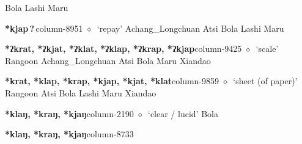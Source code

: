          Bola 
\hspace{1ex}
         Lashi 
\hspace{1ex}
         Maru 
  \item {\footnotesize \textbf{*kjap\,?\,}}{\tiny column-8951}
         $\diamond$~`repay'
         Achang\_Longchuan 
\hspace{1ex}
         Atsi 
\hspace{1ex}
         Bola 
\hspace{1ex}
         Lashi 
\hspace{1ex}
         Maru 
  \item {\footnotesize \textbf{*ʔkrat, *ʔkjat, *ʔklat, *ʔklap, *ʔkrap, *ʔkjap}}{\tiny column-9425}
         $\diamond$~`scale'
         Rangoon 
\hspace{1ex}
         Achang\_Longchuan 
\hspace{1ex}
         Atsi 
\hspace{1ex}
         Bola 
\hspace{1ex}
         Maru 
\hspace{1ex}
         Xiandao 
  \item {\footnotesize \textbf{*krat, *klap, *krap, *kjap, *kjat, *klat}}{\tiny column-9859}
         $\diamond$~`sheet (of paper)'
         Rangoon 
\hspace{1ex}
         Atsi 
\hspace{1ex}
         Bola 
\hspace{1ex}
         Lashi 
\hspace{1ex}
         Maru 
\hspace{1ex}
         Xiandao 
  \item {\footnotesize \textbf{*klaŋ, *kraŋ, *kjaŋ}}{\tiny column-2190}
         $\diamond$~`clear / lucid'
         Bola 
  \item {\footnotesize \textbf{*klaŋ, *kraŋ, *kjaŋ}}{\tiny column-8733}
